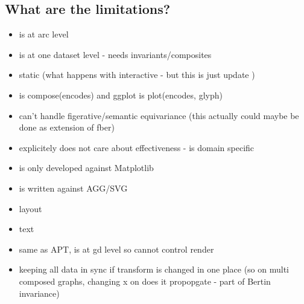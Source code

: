 \documentclass[../main.tex]{subfiles}
\begin{document}
\subsection{What are the limitations?}
\begin{itemize}
\item is at arc level
\item is at one dataset level - needs invariants/composites
\item static (what happens with interactive - but this is just update )
\item is compose(encodes) and ggplot is plot(encodes, glyph)
\item can't handle figerative/semantic equivariance (this actually could maybe be done as extension of fber)
\item explicitely does not care about effectiveness - is domain specific 
\item is only developed against Matplotlib
\item is written against AGG/SVG
\item layout
\item text
\item same as APT, is at gd level so cannot control render 
\item keeping all data in sync if transform is changed in one place (so on multi composed graphs, changing x on does it propopgate - part of Bertin invariance)
\end{itemize}
\end{document}
